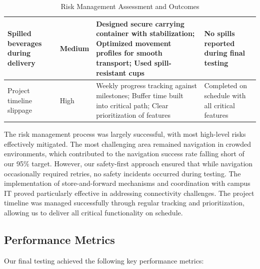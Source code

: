 \documentclass[12pt]{article}
\begin{document}
\begin{table}[h]
\begin{tabularx}{\textwidth}{|X|X|X|X|}
\hline
Spilled beverages during delivery & Medium & Designed secure carrying container with stabilization; Optimized movement profiles for smooth transport; Used spill-resistant cups & No spills reported during final testing \\
\hline
Project timeline slippage & High & Weekly progress tracking against milestones; Buffer time built into critical path; Clear prioritization of features & Completed on schedule with all critical features \\
\hline
\end{tabularx}
\caption{Risk Management Assessment and Outcomes}
\label{tab:risk_management}
\end{table}

The risk management process was largely successful, with most high-level risks effectively mitigated. The most challenging area remained navigation in crowded environments, which contributed to the navigation success rate falling short of our 95\% target. However, our safety-first approach ensured that while navigation occasionally required retries, no safety incidents occurred during testing. The implementation of store-and-forward mechanisms and coordination with campus IT proved particularly effective in addressing connectivity challenges. The project timeline was managed successfully through regular tracking and prioritization, allowing us to deliver all critical functionality on schedule.

\subsection{Performance Metrics}

Our final testing achieved the following key performance metrics:
\end{document}
